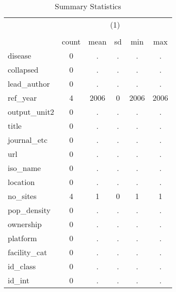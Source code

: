 \begin{table}[htbp]\centering
\def\sym#1{\ifmmode^{#1}\else\(^{#1}\)\fi}
\caption{Summary Statistics}
\begin{tabular}{l*{1}{ccccc}}
\hline\hline
            &\multicolumn{5}{c}{(1)}                                         \\
            &\multicolumn{5}{c}{}                                            \\
            &       count&        mean&          sd&         min&         max\\
\hline
disease     &           0&           .&           .&           .&           .\\
collapsed   &           0&           .&           .&           .&           .\\
lead\_author &           0&           .&           .&           .&           .\\
ref\_year    &           4&        2006&           0&        2006&        2006\\
output\_unit2&           0&           .&           .&           .&           .\\
title       &           0&           .&           .&           .&           .\\
journal\_etc &           0&           .&           .&           .&           .\\
url         &           0&           .&           .&           .&           .\\
iso\_name    &           0&           .&           .&           .&           .\\
location    &           0&           .&           .&           .&           .\\
no\_sites    &           4&           1&           0&           1&           1\\
pop\_density &           0&           .&           .&           .&           .\\
ownership   &           0&           .&           .&           .&           .\\
platform    &           0&           .&           .&           .&           .\\
facility\_cat&           0&           .&           .&           .&           .\\
id\_class    &           0&           .&           .&           .&           .\\
id\_int      &           0&           .&           .&           .&           .\\

\end{tabular}
\end{table}
